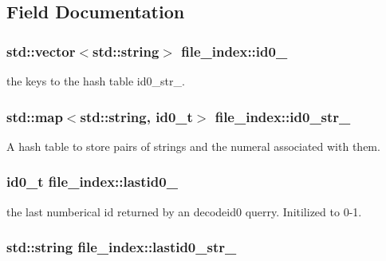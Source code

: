 \subsection{Field Documentation}
\hypertarget{classfile__index_a4be855352027b35e822cecf1f92a60a0}{
\subsubsection[{id0\-\_\-}]{\setlength{\rightskip}{0pt plus 5cm}std\-::vector$<$std\-::string$>$ file\-\_\-index\-::id0\-\_\-\hspace{0.3cm}{\ttfamily [private]}}}\label{classfile__index_a4be855352027b35e822cecf1f92a60a0}
the keys to the hash table id0\-\_\-str\-\_\-. \hypertarget{classfile__index_a6534d221b04ca8a8cdb12b05b87dd97b}{
\subsubsection[{id0\-\_\-str\-\_\-}]{\setlength{\rightskip}{0pt plus 5cm}std\-::map$<$std\-::string, id0\-\_\-t$>$ file\-\_\-index\-::id0\-\_\-str\-\_\-\hspace{0.3cm}{\ttfamily [private]}}}\label{classfile__index_a6534d221b04ca8a8cdb12b05b87dd97b}
A hash table to store pairs of strings and the numeral associated with them. \hypertarget{classfile__index_a710a18c15667280a8681bfb12cf20958}{
\subsubsection[{lastid0\-\_\-}]{\setlength{\rightskip}{0pt plus 5cm}id0\-\_\-t file\-\_\-index\-::lastid0\-\_\-\hspace{0.3cm}{\ttfamily [private]}}}\label{classfile__index_a710a18c15667280a8681bfb12cf20958}
the last numberical id returned by an decodeid0 querry. Initilized to 0-\/1. \hypertarget{classfile__index_aab103d49790f5d133985366205dbea47}{
\subsubsection[{lastid0\-\_\-str\-\_\-}]{\setlength{\rightskip}{0pt plus 5cm}std\-::string file\-\_\-index\-::lastid0\-\_\-str\-\_\-\hspace{0.3cm}{\ttfamily [private]}}}\label{classfile__index_aab103d49790f5d133985366205dbea47}
